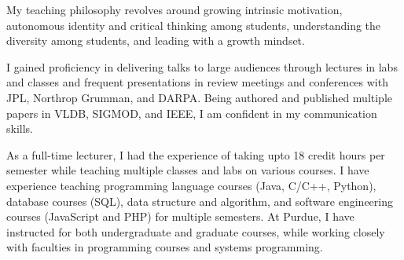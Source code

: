 \documentclass[10pt]{article}
\renewcommand*\paragraph[1]{}
\begin{document}
\paragraph{Teaching Philosophy}
My teaching philosophy revolves around growing intrinsic motivation, autonomous identity and critical thinking among students, understanding the diversity among students, and leading with a growth mindset.

\paragraph{4) Good communication skills.}
I gained proficiency in delivering talks to large audiences through lectures in labs and classes and frequent presentations in review meetings and conferences with JPL, Northrop Grumman, and DARPA. Being authored and published multiple papers in VLDB, SIGMOD, and IEEE, I am confident in my communication skills. 
%
\paragraph{4) Teaching Experience of lot of credits.}
As a full-time lecturer, I had the experience of taking upto 18 credit hours per semester while teaching multiple classes and labs on various courses. I have experience teaching programming language courses (Java, C/C++, Python), database courses (SQL), data structure and algorithm, and software engineering courses (JavaScript and PHP) for multiple semesters. At Purdue, I have instructed for both undergraduate and graduate courses, while working closely with faculties in programming courses and systems programming.
\end{document}
